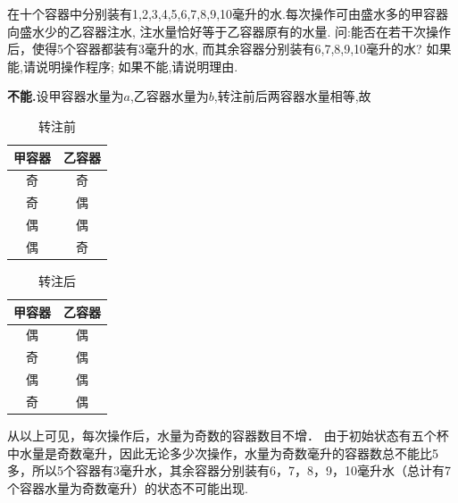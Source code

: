 \begin{problem}
    在十个容器中分别装有1,2,3,4,5,6,7,8,9,10毫升的水.每次操作可由盛水多的甲容器向盛水少的乙容器注水,
     注水量恰好等于乙容器原有的水量. 问:能否在若干次操作后，使得5个容器都装有3毫升的水, 而其余容器分别装有6,7,8,9,10毫升的水? 如果能,请说明操作程序; 如果不能,请说明理由.
\end{problem}
\begin{solution}
    \textbf{不能.}设甲容器水量为$a$,乙容器水量为$b$,转注前后两容器水量相等,故
    
    \begin{table}[ht!]
        \caption{转注前}
        \begin{center}
            \begin{tabular}{cc}
        \hline
        甲容器 & 乙容器 \\ \hline
        奇   & 奇   \\
        奇   & 偶   \\
        偶   & 偶   \\
        偶   & 奇  \\
        \hline
        \end{tabular}
        \end{center}
        
    \end{table}
    \begin{table}[ht!]
        \caption{转注后}
        \begin{center}
            \begin{tabular}{cc}
        \hline
        甲容器 & 乙容器 \\ \hline
        偶   & 偶   \\
        奇   & 偶   \\
        偶   & 偶   \\
        奇   & 偶  \\
        \hline
        \end{tabular}
        \end{center}
        
    \end{table}
    从以上可见，每次操作后，水量为奇数的容器数目不增．
    由于初始状态有五个杯中水量是奇数毫升，因此无论多少次操作，水量为奇数毫升的容器数总不能比5多，所以5个容器有3毫升水，其余容器分别装有6，7，8，9，10毫升水（总计有7个容器水量为奇数毫升）的状态不可能出现.
    
\end{solution}
